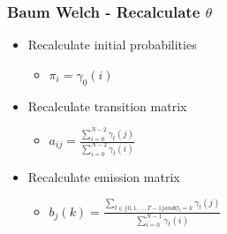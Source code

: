 \begin{frame}
	\frametitle{Baum Welch - Recalculate $\theta$}
	\begin{itemize}
		\item Recalculate initial probabilities
		\begin{itemize}
			\item $\pi_i = \gamma_0(i)$
		\end{itemize}
		\item Recalculate transition matrix
		\begin{itemize}
			\item $a_{ij} = \frac{\sum\limits_{i=0}^{N-2} \gamma_t (j)}{\sum\limits_{i=0}^{N-2} \gamma_t(i)}$
		\end{itemize}
		\item Recalculate emission matrix
		\begin{itemize}
			\item $b_j(k) = \frac{\sum\limits_{t \in \{0,1,\dots,T-1\} and \mathcal{O}_t=k} \gamma_t (j)}{\sum\limits_{i=0}^{N-1} \gamma_t(i)}$
		\end{itemize}
	\end{itemize}
\end{frame}
